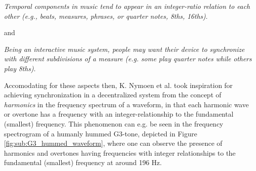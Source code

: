 		\textit{Temporal components in music tend to appear in an integer-ratio relation to each other (e.g., beats, measures, phrases, or quarter notes, 8ths, 16ths)}. \nl

		and \nl

		\textit{Being an interactive music system, people may want their device to synchronize with different subdivisions of a measure (e.g. some play quarter notes while others play 8ths).} \nl

		Accomodating for these aspects then, K. Nymoen et al. took inspiration for achieving synchronization in a decentralized system from the concept of \textit{harmonics} in the frequency spectrum of a waveform, in that each harmonic wave or overtone has a frequency with an integer-relationship to the fundamental (smallest) frequency. This phenomenon can e.g. be seen in the frequency spectrogram of a humanly hummed G3-tone, depicted in Figure \ref{fig:sub:G3_hummed_waveform}, where one can observe the presence of harmonics and overtones having frequencies with integer relationships to the fundamental (smallest) frequency at around 196 Hz.

